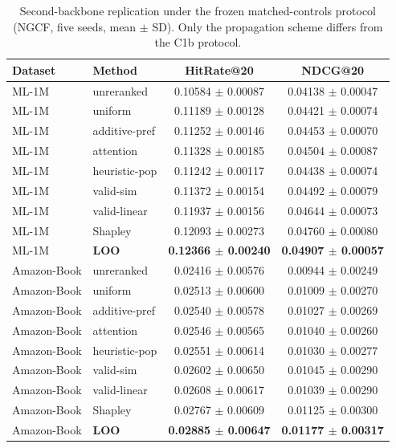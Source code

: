 \documentclass[pdflatex,sn-mathphys-num]{sn-jnl}
\begin{document}
\begin{table}[t]
\caption{Second-backbone replication under the frozen matched-controls protocol (NGCF, five seeds, mean $\pm$ SD). Only the propagation scheme differs from the C1b protocol.}\label{tab:second_backbone}
\centering
\small
\begin{tabular}{llcc}
\toprule
Dataset & Method & HitRate@20 & NDCG@20 \\
\midrule
ML-1M & unreranked & 0.10584 $\pm$ 0.00087 & 0.04138 $\pm$ 0.00047 \\
ML-1M & uniform & 0.11189 $\pm$ 0.00128 & 0.04421 $\pm$ 0.00074 \\
ML-1M & additive-pref & 0.11252 $\pm$ 0.00146 & 0.04453 $\pm$ 0.00070 \\
ML-1M & attention & 0.11328 $\pm$ 0.00185 & 0.04504 $\pm$ 0.00087 \\
ML-1M & heuristic-pop & 0.11242 $\pm$ 0.00117 & 0.04438 $\pm$ 0.00074 \\
ML-1M & valid-sim & 0.11372 $\pm$ 0.00154 & 0.04492 $\pm$ 0.00079 \\
ML-1M & valid-linear & 0.11937 $\pm$ 0.00156 & 0.04644 $\pm$ 0.00073 \\
ML-1M & Shapley & 0.12093 $\pm$ 0.00273 & 0.04760 $\pm$ 0.00080 \\
ML-1M & \textbf{LOO} & \textbf{0.12366 $\pm$ 0.00240} & \textbf{0.04907 $\pm$ 0.00057} \\
Amazon-Book & unreranked & 0.02416 $\pm$ 0.00576 & 0.00944 $\pm$ 0.00249 \\
Amazon-Book & uniform & 0.02513 $\pm$ 0.00600 & 0.01009 $\pm$ 0.00270 \\
Amazon-Book & additive-pref & 0.02540 $\pm$ 0.00578 & 0.01027 $\pm$ 0.00269 \\
Amazon-Book & attention & 0.02546 $\pm$ 0.00565 & 0.01040 $\pm$ 0.00260 \\
Amazon-Book & heuristic-pop & 0.02551 $\pm$ 0.00614 & 0.01030 $\pm$ 0.00277 \\
Amazon-Book & valid-sim & 0.02602 $\pm$ 0.00650 & 0.01045 $\pm$ 0.00290 \\
Amazon-Book & valid-linear & 0.02608 $\pm$ 0.00617 & 0.01039 $\pm$ 0.00290 \\
Amazon-Book & Shapley & 0.02767 $\pm$ 0.00609 & 0.01125 $\pm$ 0.00300 \\
Amazon-Book & \textbf{LOO} & \textbf{0.02885 $\pm$ 0.00647} & \textbf{0.01177 $\pm$ 0.00317} \\
\bottomrule
\end{tabular}
\end{table}
\end{document}
